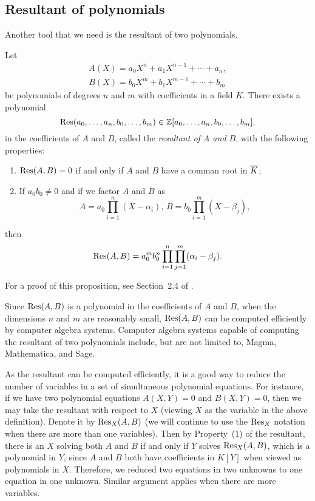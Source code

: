 \subsection{Resultant of polynomials}

Another tool that we need is the resultant of two polynomials.

\begin{proposition}
  \label{res}
  Let
  \[
  \begin{gathered}
    A(X) = a_0 X^n + a_1 X^{n-1} + \cdots + a_n,\\
    B(X) = b_0 X^m + b_1 X^{m-1} + \cdots + b_m
  \end{gathered}
  \]
  be polynomials of degrees $n$ and $m$ with coefficients
  in a field $K$. There exists a polynomial
  \[
  \mathrm{Res}(a_0, \dots, a_n, b_0, \dots, b_m) \in \mathbb{Z}[a_0, \dots, a_n, b_0,
  \dots, b_m],
  \]
  in the coefficients of $A$ and $B$, called the \emph{resultant of
    $A$ and $B$}, with the following properties:
  \begin{enumerate}
  \item $\mathrm{Res}(A, B) = 0$ if and only if $A$ and $B$ have a comman root
    in $\overline{K}$;

  \item If $a_0 b_0 \ne 0$ and if we factor $A$ and $B$ as
    \[
    A = a_0 \prod_{i=1}^n (X - \alpha_i),\,
    B = b_0 \prod_{i=1}^m (X - \beta_j),
    \]
  \end{enumerate}
  then
  \[
  \mathrm{Res}(A, B) = a_0^m b_0^n \prod_{i=1}^n \prod_{j=1}^m (\alpha_i -
  \beta_j).
  \]
\end{proposition}

For a proof of this proposition, see Section~2.4 of \cite{MR2316407}.

\begin{remark}
  Since $\mathrm{Res}(A, B)$ is a polynomial in the coefficients of $A$ and
  $B$, when the dimensions $n$ and $m$ are reasonably small, $\mathrm{Res}(A,
  B)$ can be computed efficiently by computer algebra
  systems. Computer algebra systems capable of computing the resultant
  of two polynomials include, but are not limited to, Magma,
  Mathematica, and Sage.

  As the resultant can be computed efficiently, it is a good way to
  reduce the number of variables in a set of simultaneous polynomial
  equations. For instance, if we have two polynomial equations $A(X,
  Y) = 0$ and $B(X, Y) = 0$, then we may take the resultant with
  respect to $X$ (viewing $X$ as the variable in the above
  definition). Denote it by $\mathrm{Res}_X(A, B)$ (we will continue to use
  the $\mathrm{Res}_X$ notation when there are more than one variables). Then
  by Property~(1) of the resultant, there is an $X$ solving both $A$
  and $B$ if and only if $Y$ solves $\mathrm{Res}_X(A, B)$, which is a
  polynomial in $Y$, since $A$ and $B$ both have coefficients in
  $K[Y]$ when viewed as polynomials in $X$. Therefore, we reduced two
  equations in two unknowns to one equation in one unknown. Similar
  argument applies when there are more variables.
\end{remark}

